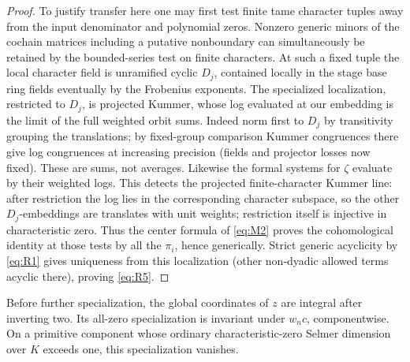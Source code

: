 \begin{proof}
To justify transfer here one may first test finite tame character tuples away from the input denominator and polynomial zeros. Nonzero generic minors of the cochain matrices including a putative nonboundary can simultaneously be retained by the bounded-series test on finite characters. At such a fixed tuple the local character field is unramified cyclic \(D_j\), contained locally in the stage base ring fields eventually by the Frobenius exponents. The specialized localization, restricted to \(D_j\), is projected Kummer, whose log evaluated at our embedding is the limit of the full weighted orbit sums. Indeed norm first to \(D_j\) by transitivity grouping the translations; by fixed-group comparison Kummer congruences there give log congruences at increasing precision (fields and projector losses now fixed). These are sums, not averages. Likewise the formal systems for \(\zeta\) evaluate by their weighted logs. This detects the projected finite-character Kummer line: after restriction the log lies in the corresponding character subspace, so the other \(D_j\)-embeddings are translates with unit weights; restriction itself is injective in characteristic zero. Thus the center formula of \eqref{eq:M2} proves the cohomological identity at those tests by all the \(\pi_i\), hence generically. Strict generic acyclicity by \eqref{eq:R1} gives uniqueness from this localization (other non-dyadic allowed terms acyclic there), proving \eqref{eq:R5}.
\end{proof}

\begin{lemma}\label{real:horizontal-integrality}
Before further specialization, the global coordinates of \(z\) are
integral after inverting two. Its all-zero specialization is invariant
under \(w_nc\), componentwise. On a primitive component whose
ordinary characteristic-zero Selmer dimension over \(K\) exceeds
one, this specialization vanishes.
\end{lemma}

